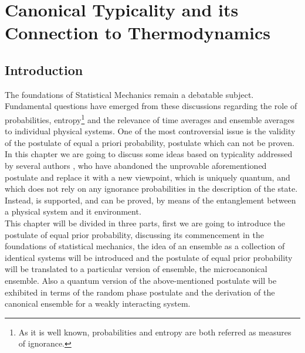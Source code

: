 \chapter{Canonical Typicality and its Connection to Thermodynamics}
\section{Introduction}

The foundations of Statistical Mechanics remain a debatable subject. Fundamental questions have emerged from these discussions regarding the role of probabilities, entropy\footnote{As it is well known, probabilities and entropy are both referred as measures of ignorance.} and the relevance of time averages and ensemble averages to individual physical systems. One of the most controversial issue is the validity of the postulate of equal a priori probability, postulate which can not be proven. \\

\indent In this chapter we are going to discuss some ideas based on typicality addressed by several authors \cite{gemmer_quantum_2004, goldstein_canonical_2006, popescu_entanglement_2006}, who have abandoned the unprovable aforementioned postulate and replace it with a new viewpoint, which is uniquely quantum, and which does not rely on any ignorance probabilities in the description of the state. Instead, is supported, and can be proved, by means of the entanglement between a physical system and it environment.\\ 

\indent This chapter will be divided in three parts, first we are going to introduce the postulate of equal prior probability, discussing its commencement in the foundations of statistical mechanics, the idea of an ensemble as a collection of identical systems will be introduced and the postulate of equal prior probability will be translated  to a particular version of ensemble, the microcanonical ensemble. Also a quantum version of the above-mentioned postulate will be exhibited in terms of the random phase postulate \cite{landau_statistical_2013} and the derivation of the canonical ensemble for a weakly interacting system.\\

